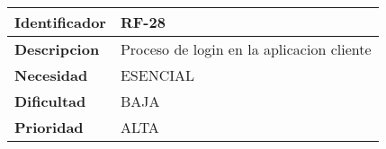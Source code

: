 \begin{center}
    \begin{tabular}{|p{2.6cm}|p{12cm}|}
    \hline
    \textbf{Identificador} & RF-28\\
    \hline
    \textbf{Descripcion} & Proceso de login en la aplicacion cliente\\
    \hline
    \textbf{Necesidad} & ESENCIAL\\
    \hline
    \textbf{Dificultad} & BAJA\\
    \hline
    \textbf{Prioridad} & ALTA\\
    \hline
    \end{tabular}
\end{center}
